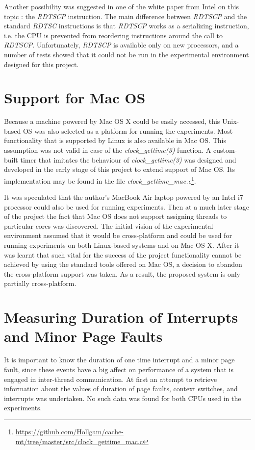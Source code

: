 Another possibility was suggested in one of the white paper from Intel on this topic \cite{Paolini2010}: the \textit{RDTSCP} instruction. The main difference between \textit{RDTSCP} and the standard \textit{RDTSC} instructions is that \textit{RDTSCP} works as a serializing instruction, i.e. the CPU is prevented from reordering instructions around the call to \textit{RDTSCP}. Unfortunately, \textit{RDTSCP} is available only on new processors, and a number of tests showed that it could not be run in the experimental environment designed for this project.

\section{Support for Mac OS}

Because a machine powered by Mac OS X could be easily accessed, this Unix-based OS was also selected as a platform for running the experiments. Most functionality that is supported by Linux is also available in Mac OS. This assumption was not valid in case of the \textit{clock\_gettime(3)} function. A custom-built timer that imitates the behaviour of \textit{clock\_gettime(3)} was designed and developed in the early stage of this project to extend support of Mac OS. Its implementation may be found in the file \textit{clock\_gettime\_mac.c}\footnote{\url{https://github.com/Hollgam/cache-mt/tree/master/src/clock\_gettime\_mac.c}}.

It was speculated that the author's MacBook Air laptop powered by an Intel i7 processor could also be used for running experiments. Then at a much later stage of the project the fact that Mac OS does not support assigning threads to particular cores was discovered. The initial vision of the experimental environment assumed that it would be cross-platform and could be used for running experiments on both Linux-based systems and on Mac OS X. After it was learnt that such vital for the success of the project functionality cannot be achieved by using the standard tools offered on Mac OS, a decision to abandon the cross-platform support was taken. As a result, the proposed system is only partially cross-platform.

\section{Measuring Duration of Interrupts and Minor Page Faults}
\label{design_duration_int_pf}

It is important to know the duration of one time interrupt and a minor page fault, since these events have a big affect on performance of a system that is engaged in inter-thread communication. At first an attempt to retrieve information about the values of duration of page faults, context switches, and interrupts was undertaken. No such data was found for both CPUs used in the experiments.

